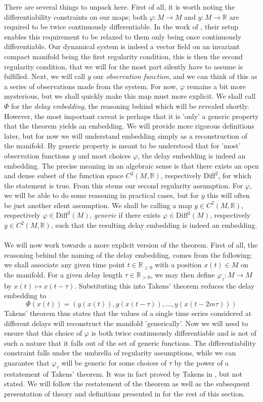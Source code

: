 \documentclass[11pt, a4paper]{memoir}
\theoremstyle{plain}
\theoremstyle{definition}
\newcommand{\mR}{\mathbb{R}}
\begin{document}
There are several things to unpack here. First of all, it is worth noting the differentiability constraints on our maps; both $\varphi: M\to M$ and $y:M\to\mR$ are required to be twice continuously differentiable. In the work of \cite{Sauer1991}, their setup enables this requirement to be relaxed to them only being once continuously differentiable. Our dynamical system is indeed a vector field on an invariant compact manifold being the first regularity condition, this is then the second regularity condition, that we will for the most part silently have to assume is fulfilled. Next, we will call $y$ our \textit{observation function}, and we can think of this as a series of observations made from the system. For now, $\varphi$ remains a bit more mysterious, but we shall quickly make this map must more explicit. We shall call $\Phi$ for the \textit{delay embedding}, the reasoning behind which will be revealed shortly. However, the most important caveat is perhaps that it is 'only' a generic property that the theorem yields an embedding. We will provide more rigorous definitions later, but for now we will understand embedding simply as a reconstruction of the manifold. By generic property is meant to be understood that for 'most' observation functions $y$ and most choices $\varphi$, the delay embedding is indeed an embedding. The precise meaning in an algebraic sense is that there exists an open and dense subset of the function space $C^2(M,\mR)$, respectively $\text{Diff}^2$, for which the statement is true. From this stems our second regularity assumption. For $\varphi$, we will be able to do some reasoning in practical cases, but for $y$ this will often be just another silent assumption. We shall be calling a map $y\in C^2(M,\mR)$, respectively $\varphi\in \text{Diff}^2(M)$, \textit{generic} if there exists $\varphi\in \text{Diff}^2(M)$, respectively $y\in C^2(M,\mR)$, such that the resulting delay embedding is indeed an embedding.\\\\
We will now work towards a more explicit version of the theorem. First of all, the reasoning behind the naming of the delay embedding, comes from the following: we shall associate any given time point $t\in \mR_{\geq 0}$ with a position $x(t)\in M$ on the manifold. For a given delay length $\tau\in \mR_{>0}$, we may then define $\varphi_\tau: M\to M$ by $x(t)\mapsto x(t-\tau)$. Substituting this into Takens' theorem reduces the delay embedding to
$$\Phi(x(t))=(y(x(t)),y(x(t-\tau)),\ldots,y(x(t-2m\tau)))$$
Takens' theorem thus states that the values of a single time series considered at different delays will reconstruct the manifold 'generically'. Now we will need to ensure that this choice of $\varphi$ is both twice continuously differentiable and is not of such a nature that it falls out of the set of generic functions. The differentiability constraint falls under the umbrella of regularity assumptions, while we can guarantee that $\varphi_\tau$ will be generic for some choices of $\tau$ by the power of a restatement of Takens' theorem. It was in fact proved by Takens in \cite{Takens}, but not stated. We will follow the restatement of the theorem as well as the subsequent presentation of theory and definitions presented in \cite{Huke} for the rest of this section.
\end{document}

